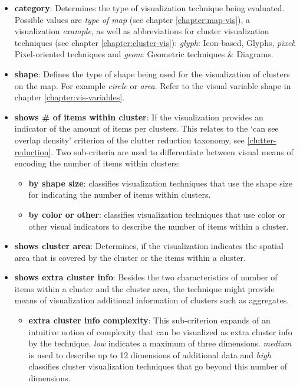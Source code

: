\begin{itemize}

\item \textbf{category}: Determines the type of visualization technique being evaluated. Possible values are \textit{type of map} (see chapter \ref{chapter:map-vis}), a visualization \textit{example}, as well as abbreviations for cluster visualization techniques (see chapter \ref{chapter:cluster-vis}): \textit{glyph}: Icon-based, Glyphs, \textit{pixel}: Pixel-oriented techniques and \textit{geom}: Geometric techniques \& Diagrams.

\item \textbf{shape}: Defines the type of shape being used for the visualization of clusters on the map. For example \textit{circle} or \textit{area}. Refer to the visual variable shape in chapter \ref{chapter:vis-variables}. 

\item \textbf{shows \# of items within cluster}: If the visualization provides an indicator of the amount of items per clusters. This relates to the `can see overlap density' criterion of the clutter reduction taxonomy, see \ref{clutter-reduction}. Two sub-criteria are used to differentiate between visual means of encoding the number of items within clusters: 

\begin{itemize}

\item \textbf{by shape size}: classifies visualization techniques that use the shape size for indicating the number of items within clusters.

\item \textbf{by color or other}: classifies visualization techniques that use color or other visual indicators to describe the number of items within a cluster.

\end{itemize}

\item \textbf{shows cluster area}: Determines, if the visualization indicates the spatial area that is covered by the cluster or the items within a cluster.

\item \textbf{shows extra cluster info}: Besides the two characteristics of number of items within a cluster and the cluster area, the technique might provide means of visualization additional information of clusters such as aggregates. 

\begin{itemize}

\item \textbf{extra cluster info complexity}: This sub-criterion expands of an intuitive notion of complexity that can be visualized as extra cluster info by the technique. \textit{low} indicates a maximum of three dimensions. \textit{medium} is used to describe up to 12 dimensions of additional data and \textit{high} classifies cluster visualization techniques that go beyond this number of dimensions.

\end{itemize}

\end{itemize}

